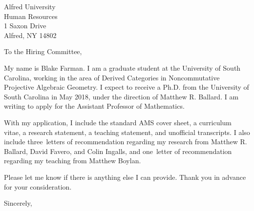 \documentclass[12pt]{letter}
\date{\today}
\def\MSPRF{As requested in the posting, I have applied for an NSF Mathematical Sciences Postdoctoral Fellowship.
  If awarded, I plan to use it to carry out the proposed research laid out in my research statement at the University of Glasgow under the direction of Michael Wemyss.}
\def\position{Assistant Professor of Mathematics}
\def\materials{the standard AMS cover sheet,
  a curriculum vitae,
  a research statement,
  a teaching statement,
  and unofficial transcripts}
\def\numresrefs{three}
\def\numteachrefs{one}
\def\refs{Matthew R. Ballard, David Favero, and Colin Ingalls}
\def\teachingrefs{Matthew Boylan}
\begin{document}
\begin{letter}{
    Alfred University\\
    Human Resources\\
    1 Saxon Drive\\
    Alfred, NY 14802
  }
  \opening{To the Hiring Committee,}

  My name is Blake Farman.
  I am a graduate student at the University of South Carolina, working in the area of Derived Categories in Noncommutative Projective Algebraic Geometry.
  I expect to receive a Ph.D. from the University of South Carolina in May 2018, under the direction of Matthew R. Ballard.
  I am writing to apply for the \position.

  With my application, I include \materials.
  I also include \numresrefs\  letters of recommendation regarding my research from \refs, and \numteachrefs\ letter of recommendation regarding my teaching from \teachingrefs.

  
  Please let me know if there is anything else I can provide.
  Thank you in advance for your consideration.
  \closing{Sincerely,}
\end{letter}
\end{document}
